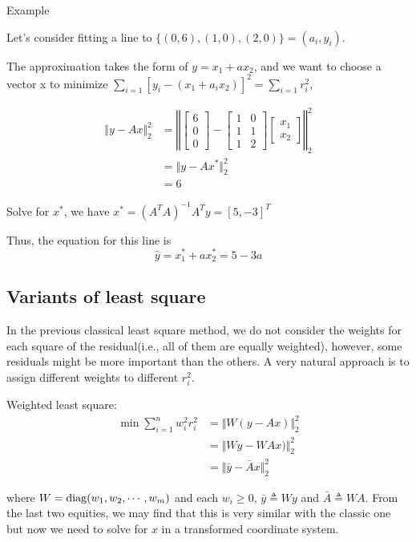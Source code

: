 \vspace{0.5cm}
Example

Let's consider fitting a line to $\{(0,6),(1,0),(2,0) \}={(a_i,y_i)}.$

The approximation takes the form of $y=x_1+ax_2$, and we want to choose a vector x to minimize $\sum_{i=1}[y_i-(x_1+a_ix_2)]^2 = \sum_{i=1} r_i^2$,

\begin{align*}
\Vert y- Ax\Vert_2^2 
&=
\left\Vert
\begin{bmatrix}
6\\
0\\
0
\end{bmatrix}
-
\begin{bmatrix}
1&0\\
1&1\\
1&2
\end{bmatrix}
\begin{bmatrix}
x_1\\
x_2
\end{bmatrix}
\right\Vert_2^2\\
&=\Vert y-Ax^*\Vert^2_2\\
&=6
\end{align*}

Solve for $x^*$, we have
$x^*=(A^TA)^{-1}A^Ty=[5 , -3]^T$

Thus, the equation for this line is
$$\hat{y}=x_1^*+ax_2^*=5-3a$$            %




\subsection{Variants of least square}

In the previous classical least square method, we do not consider the weights for each square of the residual(i.e., all of them are equally weighted), however, some residuals might be more important than the others. A very natural approach is to assign different weights to different $r_i^2$.

\vspace{0.3cm}
Weighted least square:
\begin{align*}
\min \sum_{i=1}^{n} w_i^2 r_i^2
&=\Vert W (y-Ax)\Vert ^2_2\\
&=\Vert Wy-WAx)\Vert ^2_2\\
&=\Vert \bar{y}-\bar{A}x \Vert ^2_2
\end{align*}

where $W=\operatorname{diag}(w_1, w_2, \cdots, w_m)$ and each $w_i\geq 0$, $\bar{y} \triangleq Wy$ and $\bar{A} \triangleq WA$. From the last two equities, we may find that this is very similar with the classic one but now we need to solve for $x$ in a transformed coordinate system.

